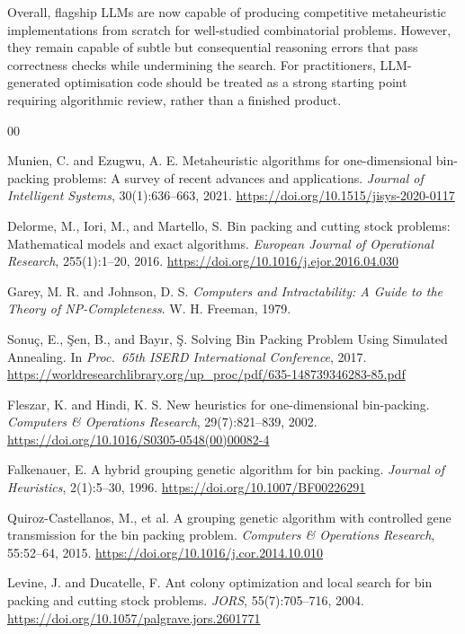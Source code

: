 \documentclass[11pt]{article}
\begin{document}
Overall, flagship LLMs are now capable of producing competitive metaheuristic implementations from scratch for well-studied combinatorial problems. However, they remain capable of subtle but consequential reasoning errors that pass correctness checks while undermining the search. For practitioners, LLM-generated optimisation code should be treated as a strong starting point requiring algorithmic review, rather than a finished product. 




\begin{thebibliography}{00}

 Munien, C. and Ezugwu, A. E. Metaheuristic algorithms for one-dimensional bin-packing problems: A survey of recent advances and applications. \textit{Journal of Intelligent Systems}, 30(1):636--663, 2021. \url{https://doi.org/10.1515/jisys-2020-0117}

 Delorme, M., Iori, M., and Martello, S. Bin packing and cutting stock problems: Mathematical models and exact algorithms. \textit{European Journal of Operational Research}, 255(1):1--20, 2016. \url{https://doi.org/10.1016/j.ejor.2016.04.030}

 Garey, M. R. and Johnson, D. S. \textit{Computers and Intractability: A Guide to the Theory of NP-Completeness}. W. H. Freeman, 1979.

 Sonu\c{c}, E., \c{S}en, B., and Bay{\i}r, \c{S}. Solving Bin Packing Problem Using Simulated Annealing. In \textit{Proc.\ 65th ISERD International Conference}, 2017. \url{https://worldresearchlibrary.org/up_proc/pdf/635-148739346283-85.pdf}

 Fleszar, K. and Hindi, K. S. New heuristics for one-dimensional bin-packing. \textit{Computers \& Operations Research}, 29(7):821--839, 2002. \url{https://doi.org/10.1016/S0305-0548(00)00082-4}

 Falkenauer, E. A hybrid grouping genetic algorithm for bin packing. \textit{Journal of Heuristics}, 2(1):5--30, 1996. \url{https://doi.org/10.1007/BF00226291}

 Quiroz-Castellanos, M., et al. A grouping genetic algorithm with controlled gene transmission for the bin packing problem. \textit{Computers \& Operations Research}, 55:52--64, 2015. \url{https://doi.org/10.1016/j.cor.2014.10.010}

 Levine, J. and Ducatelle, F. Ant colony optimization and local search for bin packing and cutting stock problems. \textit{JORS}, 55(7):705--716, 2004. \url{https://doi.org/10.1057/palgrave.jors.2601771}


\end{thebibliography}
\end{document}
